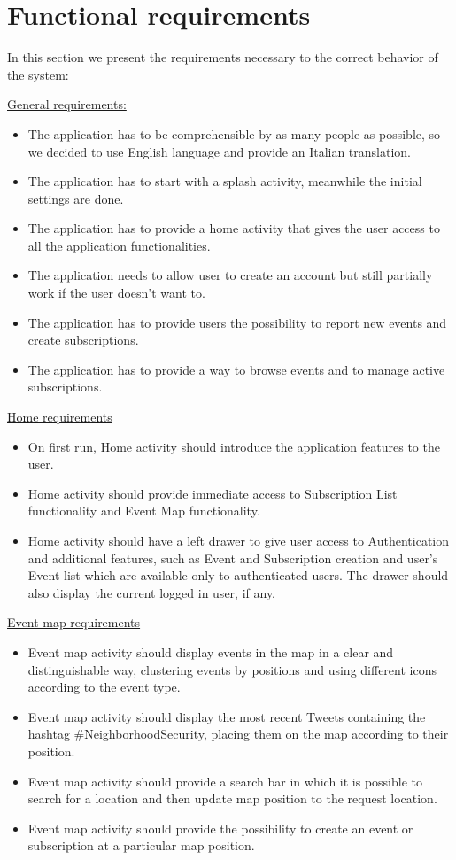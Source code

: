 \documentclass[a4paper]{scrreprt}
\begin{document}
\section{Functional requirements}
In this section we present the requirements necessary to the correct behavior of the system:

\bigskip\underline{General requirements:}
\begin{itemize}
\item The application has to be comprehensible by as many people as possible, so we decided to use English language and provide an Italian translation.
\item The application has to start with a splash activity, meanwhile the initial settings are done.
\item The application has to provide a home activity that gives the user access to all the application functionalities.
\item The application needs to allow user to create an account but still partially work if the user doesn't want to.
\item The application has to provide users the possibility to report new events and create subscriptions.
\item The application has to provide a way to browse events and to manage active subscriptions.
\end{itemize}

\underline{Home requirements}
\begin{itemize}
\item On first run, Home activity should introduce the application features to the user.
\item Home activity should provide immediate access to Subscription List functionality and Event Map functionality.
\item Home activity should have a left drawer to give user access to Authentication and additional features, such as Event and Subscription creation and user's Event list which are available only to authenticated users. The drawer should also display the current logged in user, if any.
\end{itemize}

\underline{Event map requirements}
\begin{itemize}
\item Event map activity should display events in the map in a clear and distinguishable way, clustering events by positions and using different icons according to the event type.
\item Event map activity should display the most recent Tweets containing the hashtag \#NeighborhoodSecurity, placing them on the map according to their position.
\item Event map activity should provide a search bar in which it is possible to search for a location and then update map position to the request location.
\item Event map activity should provide the possibility to create an event or subscription at a particular map position.
\end{itemize}
\end{document}
